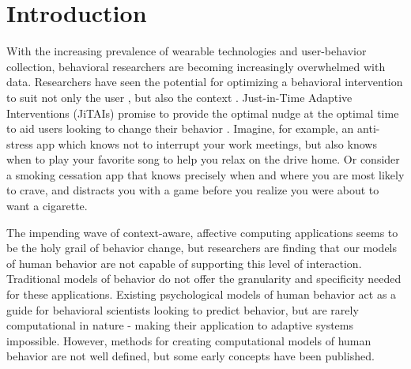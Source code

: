 \documentclass{sigchi}
\begin{document}

 

\section{Introduction}
With the increasing prevalence of wearable technologies and user-behavior collection, behavioral researchers are becoming increasingly overwhelmed with data.
Researchers have seen the potential for optimizing a behavioral intervention to suit not only the user \cite{beck2010challenges}, but also the context \cite{brailsford2010towards, collins2004}. 
Just-in-Time Adaptive Interventions (JiTAIs) promise to provide the optimal nudge at the optimal time to aid users looking to change their behavior \cite{nahum2014}.
Imagine, for example, an anti-stress app which knows not to interrupt your work meetings, but also knows when to play your favorite song to help you relax on the drive home.
Or consider a smoking cessation app that knows precisely when and where you are most likely to crave, and distracts you with a game before you realize you were about to want a cigarette.

The impending wave of context-aware\cite{schilit1994context}, affective computing\cite{picard2000affective} applications seems to be the holy grail of behavior change, but researchers are finding that our models of human behavior are not capable of supporting this level of interaction.
Traditional models of behavior do not offer the granularity and specificity needed for these applications\cite{riley2011health}.
Existing psychological models of human behavior act as a guide for behavioral scientists looking to predict behavior, but are rarely computational in nature - making their application to adaptive systems impossible.
However, methods for creating computational models of human behavior are not well defined, but some early concepts have been published.

\end{document}
